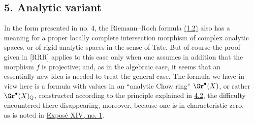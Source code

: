 \subsection*{5. Analytic variant}
In the form presented in no. 4, the Riemann--Roch formula \hyperlink{sga6.e00.eq.1-2}{(1.2)} also has a meaning for a proper locally complete intersection morphism of complex analytic spaces, or of rigid analytic spaces in the sense of Tate. But of course the proof given in [RRR] applies to this case only when one assumes in addition that the morphism $f$ is projective; and, as in the algebraic case, it seems that an essentially new idea is needed to treat the general case. The formula we have in view here is a formula with values in an ``analytic Chow ring'' $\Gr^\bullet(X)$, or rather $\Gr^\bullet(X)_{\mathbb Q}$, constructed according to the principle explained in \hyperlink{sga6.e00.sec.4.2}{4.2}, the difficulty encountered there disappearing, moreover, because one is in characteristic zero, as is noted in \hyperlink{sga6.e14.sec.1}{Expos\'e XIV, no. 1}.

